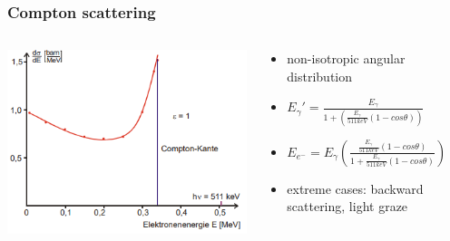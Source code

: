 \documentclass[aspectratio=1610, 12pt]{beamer}
\begin{document}
\begin{frame}\frametitle{Compton scattering}
  \begin{columns}
    \begin{column}[c]{0.48\textwidth}
      \includegraphics[width=\textwidth]{plots/compton_kante.png}
    \end{column}
    \begin{column}[c]{0.48\textwidth}
      \begin{itemize}
        \item non-isotropic angular distribution
        \item $E_\gamma\prime = \frac{E_\gamma}{1 + \left( \frac{E_\gamma}{511 keV} (1 - cos\theta)\right)}$
        \item $E_{e^-} = E_\gamma \left( \frac{\frac{E_\gamma}{511 keV}(1 - cos\theta)}{1 + \frac{E_\gamma}{511 keV}(1 - cos\theta)} \right)$
        \item extreme cases: backward scattering, light graze
      \end{itemize}
    \end{column}
  \end{columns}
\end{frame}
\end{document}
